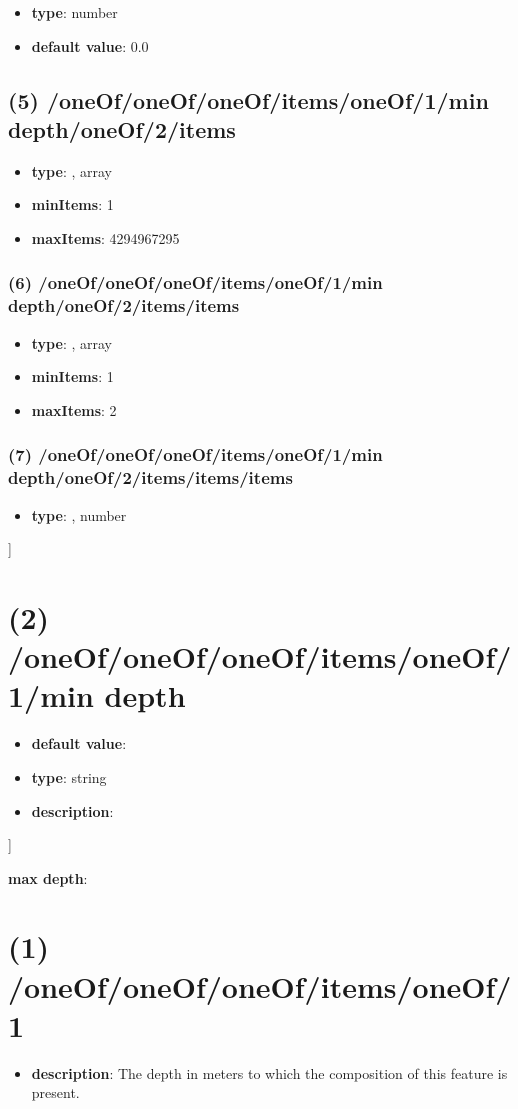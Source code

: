 \begin{itemize}[leftmargin=6em]\item {\bf type}: number\item {\bf default value}: 0.0
\end{itemize}\subsection{(5) /oneOf/oneOf/oneOf/items/oneOf/1/min depth/oneOf/2/items}
\begin{itemize}[leftmargin=5em]\item {\bf type}: , array\item {\bf minItems}: 1
\item {\bf maxItems}: 4294967295
\end{itemize}\subsubsection{(6) /oneOf/oneOf/oneOf/items/oneOf/1/min depth/oneOf/2/items/items}
\begin{itemize}[leftmargin=6em]\item {\bf type}: , array\item {\bf minItems}: 1
\item {\bf maxItems}: 2
\end{itemize}\subsubsection{(7) /oneOf/oneOf/oneOf/items/oneOf/1/min depth/oneOf/2/items/items/items}
\begin{itemize}[leftmargin=7em]\item {\bf type}: , number\end{itemize}]\section{(2) /oneOf/oneOf/oneOf/items/oneOf/1/min depth}
\begin{itemize}[leftmargin=2em]\item {\bf default value}: 
\item {\bf type}: string
\item {\bf description}: 
\end{itemize}]\item {\bf max depth}: \section{(1) /oneOf/oneOf/oneOf/items/oneOf/1}
\begin{itemize}[leftmargin=1em]\item {\bf description}: The depth in meters to which the composition of this feature is present.
\end{itemize}
